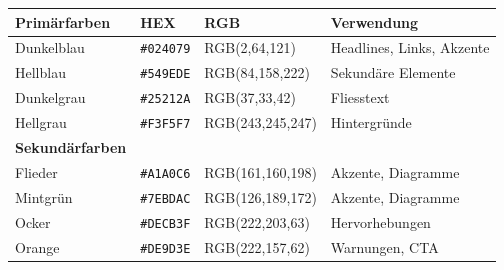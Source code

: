
\begin{tcolorbox}[colback=blue!5!white, colframe=blue!75!black, title=Quick Reference: FehrAdvice Farben]
\begin{tabular}{llll}
\textbf{Primärfarben} & \textbf{HEX} & \textbf{RGB} & \textbf{Verwendung} \\
\hline
Dunkelblau & \texttt{\#024079} & RGB(2,64,121) & Headlines, Links, Akzente \\
Hellblau & \texttt{\#549EDE} & RGB(84,158,222) & Sekundäre Elemente \\
Dunkelgrau & \texttt{\#25212A} & RGB(37,33,42) & Fliesstext \\
Hellgrau & \texttt{\#F3F5F7} & RGB(243,245,247) & Hintergründe \\
\hline
\textbf{Sekundärfarben} & & & \\
\hline
Flieder & \texttt{\#A1A0C6} & RGB(161,160,198) & Akzente, Diagramme \\
Mintgrün & \texttt{\#7EBDAC} & RGB(126,189,172) & Akzente, Diagramme \\
Ocker & \texttt{\#DECB3F} & RGB(222,203,63) & Hervorhebungen \\
Orange & \texttt{\#DE9D3E} & RGB(222,157,62) & Warnungen, CTA \\
\end{tabular}
\end{tcolorbox}



